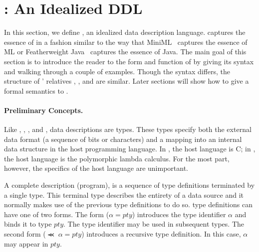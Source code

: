 \section{\ipads{}:  An Idealized DDL}
\label{sec:ipads}

In this section, we define \ipads{}, an idealized data description
language.  \ipads{} captures the essence of \pads{} in a fashion
similar to the way that MiniML~\cite{miniml} captures the essence of ML or Featherweight
Java~\cite{igarasi+:featherweight} captures the essence of Java.  The main goal of this section is to introduce
the reader to the form and function of \ipads{} by giving its syntax
and walking through a couple of examples.  Though the syntax differs,
the structure of \pads{}' relatives \blt, \packettypes, and
\datascript{} are similar.  Later sections will show how to give a
formal semantics to \ipads.

\paragraph*{Preliminary Concepts.}
Like \pads, \packettypes, \datascript, and \blt,
\ipads{} data descriptions are types.  These types
specify both the external data format (a sequence of bits or characters)
and a mapping into an internal data structure 
in the host programming language.  In \pads, the host language is
C; in \ipads, the host language is the polymorphic lambda 
calculus.  For the most part, however, the specifics of the
host language are unimportant.  

A complete \ipads{} description (program), is a sequence of type definitions
terminated by a single type.  This terminal type describes the
entirety of a data source and it normally makes use of the previous 
type definitions to do so.  \ipads{} type definitions can have one of
two forms.  The form ($\alpha = pty$) introduces the type identifier
$\alpha$ and binds it to \ipads{} type $pty$.
The type identifier may be used in
subsequent types.  The second form  ($\Prec{}\; \alpha = pty$) introduces
a recursive type definition.  In this case, $\alpha$ may appear in $pty$.


